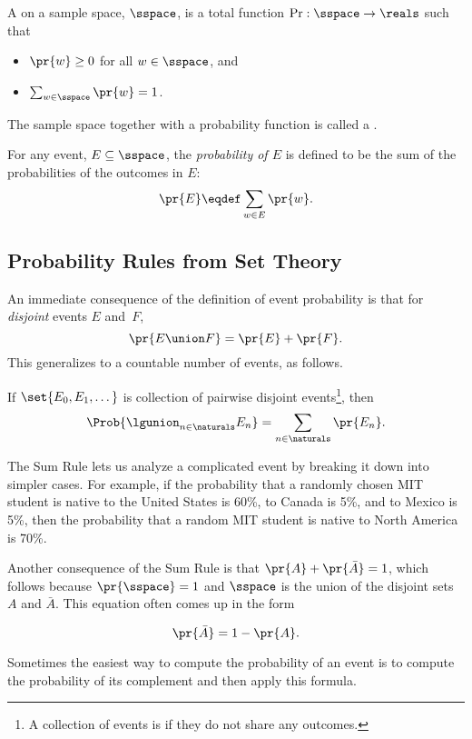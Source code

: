 \begin{definition}\label{LN12:probsp}
 A  on a sample space, $\sspace$, is a total
 function $\operatorname{Pr}: \sspace\to \reals$ such that
\begin{itemize}
\item $\pr{w} \geq 0$ for all $w \in \sspace$, and
\item $\sum_{w \in \sspace} \pr{w} = 1$.
\end{itemize}
The sample space together with a probability function is called a
.

For any event, $E \subseteq \sspace$, the 
\emph{probability of $E$} is defined to be the sum of the probabilities of
the outcomes in $E$:
\[
    \pr{E} \eqdef \sum_{w \in E} \pr{w}.
\]
\end{definition}

\subsection{Probability Rules from Set Theory}

An immediate consequence of the definition of event probability is
that for \emph{disjoint} events $E$ and~$F$,
\[
    \pr{E \union F} = \pr{E} + \pr{F}.
\]
This generalizes to a countable number of events, as follows.

\begin{rul*}
  If $\set{E_0,E_1,\dots}$ is collection of pairwise disjoint
  events\footnote{A collection of events is 
    if they do not share any outcomes.}, then
\[
    \Prob{\lgunion_{n\in\naturals}E_n} = \sum_{n\in\naturals} \pr{E_n}.
\]
\end{rul*}

The Sum Rule lets us analyze a complicated event by breaking it down
into simpler cases.  For example, if the probability that a randomly
chosen MIT student is native to the United States is 60\%, to Canada
is 5\%, and to Mexico is 5\%, then the probability that a random MIT
student is native to North America is 70\%.

Another consequence of the Sum Rule is that $\pr{A} + \pr{\bar{A}} = 1$,
which follows because $\pr{\sspace}=1$ and $\sspace$ is the union of the
disjoint sets $A$ and $\bar{A}$.  This equation often comes up in the form
\begin{rul*} 
\[
\pr{\bar{A}}  =  1 - \pr{A}.
\]
\end{rul*}
Sometimes the easiest way to compute the probability of an event is to compute
the probability of its complement and then apply this formula.

